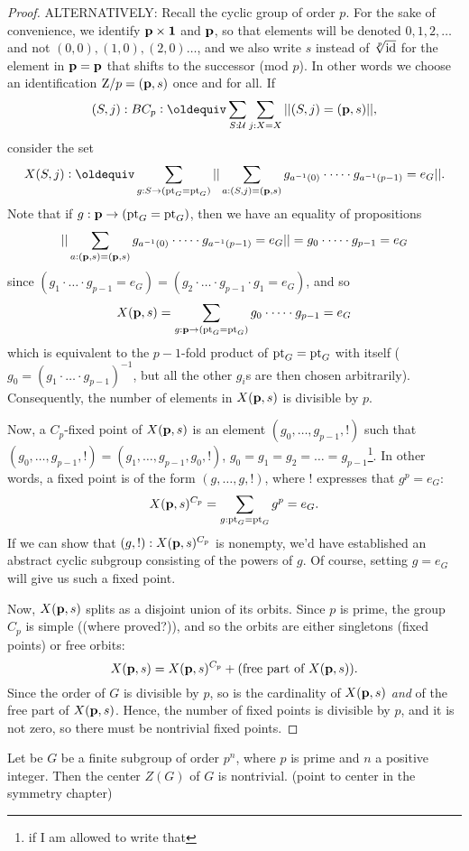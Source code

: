 \begin{proof}
{ALTERNATIVELY:
Recall the cyclic group of order $p$.  For the sake of convenience, we identify $\mathbf{p}\times\mathbf{1}$ and $\mathbf{p}$, so that elements will be denoted $0,1,2,\dots$ and not $(0,0), (1,0),(2,0)\dots$, and we also write $s$ instead of $\sqrt[p]{\mathord{\mathrm{id}}}$ for the element in $\mathbf{p}=\mathbf{p}$ that shifts to the successor (mod $p$).  In other words we choose an identification $\mathrm{Z}/p=(\mathbf{p},s)$ once and for all.  If 
$$(S,j):BC_p\defequi\sum_{S:\UU}\sum_{j:X=X}||(S,j)=(\bn p,s)||,$$ consider the set 
$$X(S,j)\defequi\sum_{g:S\to (\pt_G=\pt_G)}||\sum_{a:(S,j)=(\bn p,s)}g_{a^{-1}(0)}\cdot\dots\cdot g_{a^{-1}(p-1)}=e_G||.$$ 
Note that if $g:\mathbf{p}\to({\mathord{\mathrm{pt}}}_G={\mathord{\mathrm{pt}}}_G)$, then we have an equality of propositions
$$||\sum_{a:(\mathbf{p},s)=(\mathbf{p},s)}g_{a^{-1}(0)}\cdot\dots\cdot g_{a^{-1}(p-1)}=e_G||=g_{0}\cdot\dots\cdot g_{p-1}=e_G$$
since $(g_1\cdot\dots\cdot g_{p-1}=e_G)=(g_2\cdot\dots\cdot g_{p-1}\cdot g_1=e_G)$,
and so 
$$X(\mathbf{p},s)=\sum_{g:\mathbf{p}\to ({\mathord{\mathrm{pt}}}_G={\mathord{\mathrm{pt}}}_G)}g_{0}\cdot\dots\cdot g_{p-1}=e_G$$ 
which is equivalent to the $p-1$-fold product of ${\mathord{\mathrm{pt}}}_G={\mathord{\mathrm{pt}}}_G$ with itself ($g_0=(g_1\cdot\dots\cdot g_{p-1})^{-1}$, but all the other $g_i$s are then chosen arbitrarily).  Consequently, the number of elements in $X(\mathbf{p},s)$ is divisible by $p$.

Now, a $C_p$-fixed point of $X(\mathbf{p},s)$ is an element $(g_0,\dots,g_{p-1},!)$ such that $(g_0,\dots,g_{p-1},!)=(g_1,\dots,g_{p-1},g_0,!)$, \ie $g_0=g_1=g_2=\dots=g_{p-1}$\footnote{if I am allowed to write that}.  In other words, a fixed point is of the form $(g,\dots,g,!)$, where $!$ expresses that $g^p=e_G$:
$$X(\mathbf{p},s)^{C_p}=\sum_{g:{\mathord{\mathrm{pt}}}_G={\mathord{\mathrm{pt}}}_G}g^p=e_G.$$  If we can show that $(g,!):X(\mathbf{p},s)^{C_p}$ is nonempty, we'd have established an abstract cyclic subgroup consisting of the powers of $g$.  Of course, setting $g=e_G$ will give us such a fixed point.

 Now, $X(\mathbf{p},s)$ splits as a disjoint union of its orbits.  Since $p$ is prime, the group $C_p$ is simple ((where proved?)), and so the orbits are either singletons (fixed points) or free orbits:
$$X(\mathbf{p},s)= X(\mathbf{p},s)^{C_p}+(\text{free part of }X(\mathbf{p},s)).$$
Since the order of $G$ is divisible by $p$, so is the cardinality of $X(\mathbf{p},s)$ \emph{and} of the free part of $X(\mathbf{p},s)$.  Hence, the number of fixed points is divisible by $p$, and it is not zero, so there must be nontrivial fixed points.
}%
\end{proof}
\begin{lemma}
  \label{lem:nontrivcenter}
  Let be $G$ be a finite subgroup of order $p^n$, where $p$ is prime and $n$ a positive integer.  
Then the center $Z(G)$ of $G$ is nontrivial. 
(point to center in the symmetry chapter)
\end{lemma}
